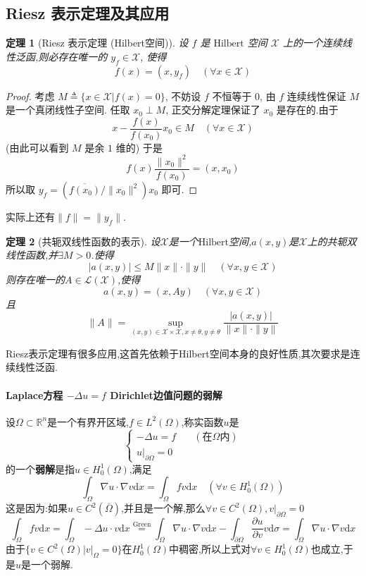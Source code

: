 \documentclass[12pt,a4paper]{article}
\newtheorem{thm}{定理}[subsection]  %
\begin{document}
\subsection{Riesz 表示定理及其应用}
\begin{thm}[Riesz 表示定理 (Hilbert空间)]
    设 $f$ 是 $\mathrm{Hilbert}$ 空间 $\mathscr{X}$ 上的一个连续线性泛函,则必存在唯一的 $y_f \in \mathscr{X}$, 使得
    \[f(x) = (x,y_f)\quad (\forall x \in \mathscr{X})\]
\end{thm}
\begin{proof}
    考虑 $M\triangleq \{x\in \mathscr{X}|f(x) = 0\}$, 不妨设 $f$ 不恒等于 $0$, 由 $f$ 连续线性保证 $M$ 是一个真闭线性子空间.
    任取 $x_0 \perp M$, 正交分解定理保证了 $x_0$ 是存在的.由于 \[x-\frac{f(x)}{f(x_0)}x_0 \in M \quad (\forall x \in \mathscr{X})\]
    (由此可以看到 $M$ 是余 $1$ 维的) 于是 \[f(x)\frac{\|x_0\|^2}{f(x_0)} = (x,x_0)\]所以取 $y_f = (\overline{f(x_0)}/\|x_0\|^2) x_0$ 即可.
\end{proof}
实际上还有$\|f\| = \|y_f\|$.
\begin{thm}[共轭双线性函数的表示]
    设$\mathscr{X}$是一个$\mathrm{Hilbert}$空间,$a(x,y)$是$\mathscr{X}$上的共轭双线性函数,并$\exists M>0$.使得
    \[|a(x,y)| \leq M\|x\|\cdot \|y\|\quad (\forall x,y \in \mathscr{X})\]
    则存在唯一的$A \in \mathscr{L}(\mathscr{X})$,使得\[a(x,y) = (x,Ay) \quad (\forall x,y \in \mathscr{X})\]
    且\[\|A\| = \underset{(x,y) \in \mathscr{X}\times \mathscr{X}, x \neq \theta, y \neq \theta}{\sup}\frac{|a(x,y)|}{\|x\|\cdot \|y\|} \]
\end{thm}
Riesz表示定理有很多应用,这首先依赖于\rm{Hilbert}空间本身的良好性质,其次要求是连续线性泛函.

\paragraph{Laplace方程 $-\Delta u = f$ Dirichlet边值问题的弱解}\mbox{} 

设$\Omega\subset \mathbb{R}^n$是一个有界开区域,$f\in L^2(\Omega)$,称实函数$u$是
\begin{equation}\begin{cases}
    -\Delta u = f &\quad (\text{在}\Omega \text{内})\\u|_{\partial \Omega} = 0&
\end{cases}\tag{\#} \end{equation}
的一个\textbf{弱解}是指$u \in H_0^1(\Omega)$,满足
\[\int_{\Omega} \nabla u \cdot \nabla v \mathrm{d}x = \int_{\Omega}fv\mathrm{d}x \quad (\forall v \in H_0^1(\Omega))\]
这是因为:如果$u \in C^2(\overline{\Omega})$,并且是一个解,那么$\forall v \in C^2(\Omega),v|_{\partial \Omega} = 0$
\[\int_{\Omega}fv\mathrm{d}x = \int_{\Omega}-\Delta u \cdot v\mathrm{d}x 
\overset{\mathrm{Green}}{=} \int_{\Omega}\nabla u \cdot \nabla v \mathrm{d}x - \int_{\partial \Omega} \frac{\partial u}{\partial v} v \mathrm{d}\sigma
= \int_{\Omega}\nabla u \cdot \nabla v \mathrm{d}x\]
由于$\{v \in C^2(\Omega)|v|_{\Omega} = 0\}$在$H_0^1(\Omega)$中稠密,所以上式对$\forall v\in H_0^1(\Omega)$也成立,于是$u$是一个弱解.
\end{document}
